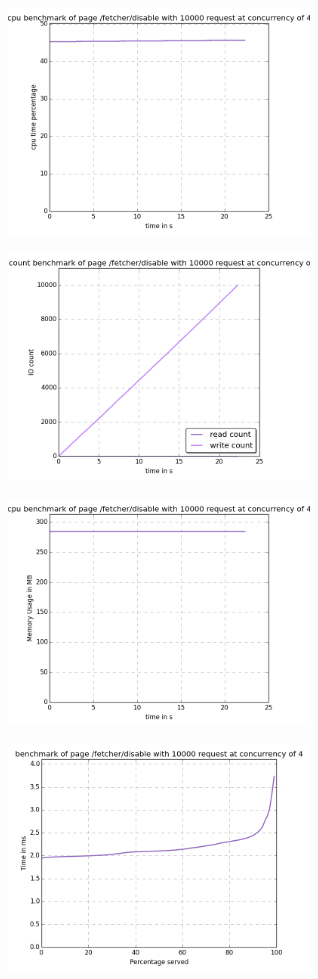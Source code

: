 \begin{center}
\includegraphics[width=0.6\textwidth]{img/fetcher.disable.cpu.png}



\includegraphics[width=0.6\textwidth]{img/fetcher.disable.io-count.png}



\includegraphics[width=0.6\textwidth]{img/fetcher.disable.mem.png}



\includegraphics[width=0.6\textwidth]{img/fetcher.disable.serv-time.png}




\end{center}
